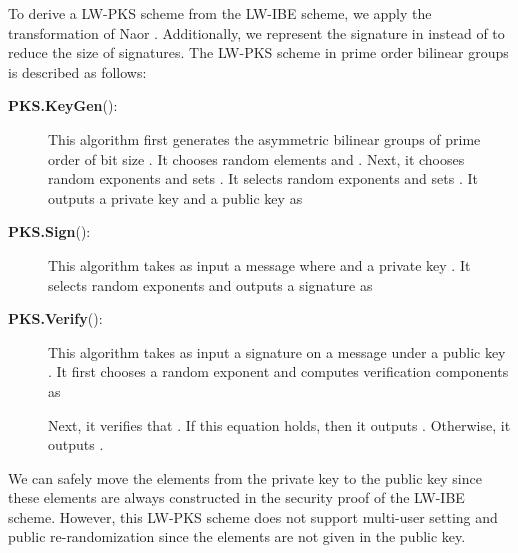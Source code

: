\documentclass[11pt,letterpaper]{article}
\begin{document}
To derive a LW-PKS scheme from the LW-IBE scheme, we apply the transformation
of Naor \cite{BonehF01}. Additionally, we represent the signature in 
instead of  to reduce the size of signatures. The LW-PKS scheme in
prime order bilinear groups is described as follows:

\begin{description}
\item [\textbf{PKS.KeyGen}():] This algorithm first generates
    the asymmetric bilinear groups  of prime order  of bit
    size . It chooses random elements  and
    . Next, it chooses random exponents  and sets . It selects
    random exponents  and sets . It outputs a private key  and a
    public key as
    

\item [\textbf{PKS.Sign}():] This algorithm takes as input a message
     where  and a private key . It selects
    random exponents  and outputs a signature as
    

\item [\textbf{PKS.Verify}():] This algorithm takes as input
    a signature  on a message  under a public key
    . It first chooses a random exponent  and computes
    verification components as
    
    Next, it verifies that . If
    this equation holds, then it outputs . Otherwise, it outputs .
\end{description}

We can safely move the elements  from the private key to the
public key since these elements are always constructed in the security proof
of the LW-IBE scheme. However, this LW-PKS scheme does not support multi-user
setting and public re-randomization since the elements  are not
given in the public key.
\end{document}
